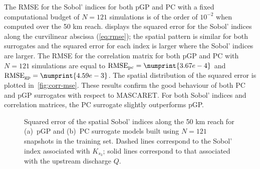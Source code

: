 The RMSE for the Sobol' indices for both pGP and PC with a fixed computational budget of $N = 121$ simulations is of the order of $10^{-2}$ when computed over the 50 km reach.  displays the squared error for the Sobol' indices along the curvilinear abscissa (\cref{eq:rmse}); the spatial pattern is similar for both surrogates and the squared error for each index is larger where the Sobol' indices are larger. The RMSE for the correlation matrix for both pGP and PC with $N = 121$ simulations are equal to $\text{RMSE}_{\text{pc}} = \numprint{3.67e-4}$ and $\text{RMSE}_{\text{gp}} = \numprint{4.59e-3}$. The spatial distribution of the squared error is plotted in~\cref{fig:corr-mse}. These results confirm the good behaviour of both PC and pGP surrogates with respect to MASCARET. For both Sobol' indices and correlation matrices, the PC surrogate slightly outperforms pGP. 

\begin{figure}[!h]               
\centering
{}
\caption{Squared error of the spatial Sobol' indices along the 50 km reach for (a)~pGP and (b)~PC surrogate models built using $N = 121$ snapshots in the training set. Dashed lines correspond to the Sobol' index associated with $K_{s_3}$; solid lines correspond to that associated with the upstream discharge $Q$.}
\label{fig:sobol-map}
\end{figure}

